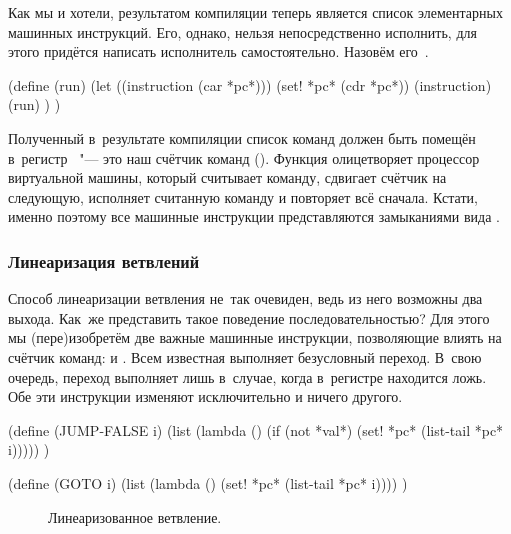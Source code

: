 Как мы и хотели, результатом компиляции теперь является список элементарных
машинных инструкций. Его, однако, нельзя непосредственно исполнить, для этого
придётся написать исполнитель самостоятельно. Назовём его~.

\begin{code:lisp}
(define (run)
  (let ((instruction (car *pc*)))
    (set! *pc* (cdr *pc*))
    (instruction)
    (run) ) )
\end{code:lisp}

Полученный в~результате компиляции список команд должен быть помещён
в~регистр~ "--- это наш счётчик команд ().
Функция  олицетворяет процессор виртуальной машины, который считывает
команду, сдвигает счётчик на следующую, исполняет считанную команду и повторяет
всё сначала. Кстати, именно поэтому все машинные инструкции представляются
замыканиями вида .


\subsubsection{Линеаризация ветвлений}%
\label{compilation/bytes/customize/sssect:lin-conditional}

Способ линеаризации ветвления не~так очевиден, ведь из него возможны два выхода.
Как~же представить такое поведение последовательностью? Для этого мы
(пере)изобретём две важные машинные инструкции, позволяющие влиять на счётчик
команд:  и . Всем известная  выполняет
безусловный переход. В~свою очередь,  переход выполняет лишь
в~случае, когда в~регистре  находится ложь. Обе эти инструкции
изменяют исключительно  и ничего другого.


\begin{code:lisp}
(define (JUMP-FALSE i)
  (list (lambda () (if (not *val*) (set! *pc* (list-tail *pc* i))))) )

(define (GOTO i)
  (list (lambda () (set! *pc* (list-tail *pc* i)))) )
\end{code:lisp}

\begin{figure}[t]\begin{center}

\end{center}%
\caption{Линеаризованное ветвление.}%
\label{compilation/bytes/customize/lin-conditional/pic:subj}%
\end{figure}

